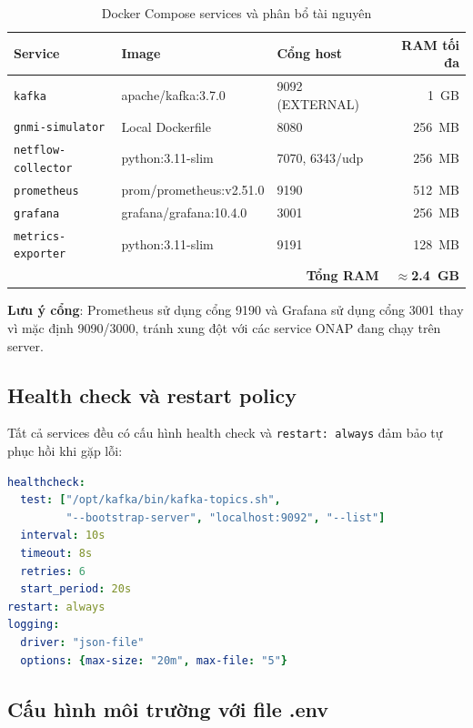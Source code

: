 \documentclass[12pt,a4paper]{article}
\begin{document}
\begin{table}[H]
\centering
\caption{Docker Compose services và phân bổ tài nguyên}
\label{tab:services}
\begin{tabular}{lllr}
\toprule
\textbf{Service} & \textbf{Image} & \textbf{Cổng host} & \textbf{RAM tối đa} \\
\midrule
\texttt{kafka}            & apache/kafka:3.7.0        & 9092 (EXTERNAL) & 1~GB \\
\texttt{gnmi-simulator}   & Local Dockerfile          & 8080 & 256~MB \\
\texttt{netflow-collector}& python:3.11-slim          & 7070, 6343/udp & 256~MB \\
\texttt{prometheus}       & prom/prometheus:v2.51.0   & 9190 & 512~MB \\
\texttt{grafana}          & grafana/grafana:10.4.0    & 3001 & 256~MB \\
\texttt{metrics-exporter} & python:3.11-slim          & 9191 & 128~MB \\
\midrule
\multicolumn{3}{r}{\textbf{Tổng RAM}} & \textbf{$\approx$2.4~GB} \\
\bottomrule
\end{tabular}
\end{table}

\textbf{Lưu ý cổng}: Prometheus sử dụng cổng 9190 và Grafana sử dụng cổng 3001 thay vì mặc định 9090/3000, tránh xung đột với các service ONAP đang chạy trên server.

\subsection{Health check và restart policy}

Tất cả services đều có cấu hình health check và \texttt{restart: always} đảm bảo tự phục hồi khi gặp lỗi:

\begin{lstlisting}[language=yaml,caption={Ví dụ cấu hình health check của Kafka}]
healthcheck:
  test: ["/opt/kafka/bin/kafka-topics.sh",
         "--bootstrap-server", "localhost:9092", "--list"]
  interval: 10s
  timeout: 8s
  retries: 6
  start_period: 20s
restart: always
logging:
  driver: "json-file"
  options: {max-size: "20m", max-file: "5"}
\end{lstlisting}

\subsection{Cấu hình môi trường với file .env}
\end{document}
